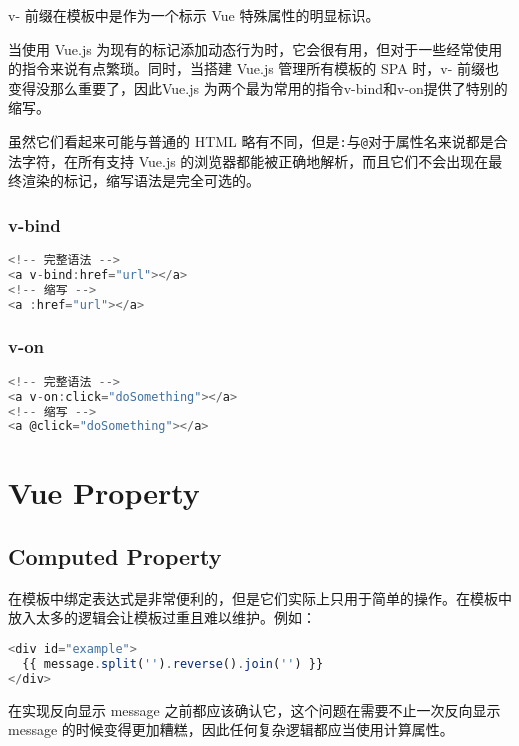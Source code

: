 v- 前缀在模板中是作为一个标示 Vue 特殊属性的明显标识。

当使用 Vue.js 为现有的标记添加动态行为时，它会很有用，但对于一些经常使用的指令来说有点繁琐。同时，当搭建 Vue.js 管理所有模板的 SPA 时，v- 前缀也变得没那么重要了，因此Vue.js 为两个最为常用的指令v-bind和v-on提供了特别的缩写。

虽然它们看起来可能与普通的 HTML 略有不同，但是\texttt{:}与\texttt{@}对于属性名来说都是合法字符，在所有支持 Vue.js 的浏览器都能被正确地解析，而且它们不会出现在最终渲染的标记，缩写语法是完全可选的。


\subsection{v-bind}




\begin{lstlisting}[language=JavaScript]
<!-- 完整语法 -->
<a v-bind:href="url"></a>
<!-- 缩写 -->
<a :href="url"></a>
\end{lstlisting}


\subsection{v-on}



\begin{lstlisting}[language=JavaScript]
<!-- 完整语法 -->
<a v-on:click="doSomething"></a>
<!-- 缩写 -->
<a @click="doSomething"></a>
\end{lstlisting}

\chapter{Vue Property}


\section{Computed Property}


在模板中绑定表达式是非常便利的，但是它们实际上只用于简单的操作。在模板中放入太多的逻辑会让模板过重且难以维护。例如：

\begin{lstlisting}[language=JavaScript]
<div id="example">
  {{ message.split('').reverse().join('') }}
</div>
\end{lstlisting}

在实现反向显示 message 之前都应该确认它，这个问题在需要不止一次反向显示 message 的时候变得更加糟糕，因此任何复杂逻辑都应当使用计算属性。



